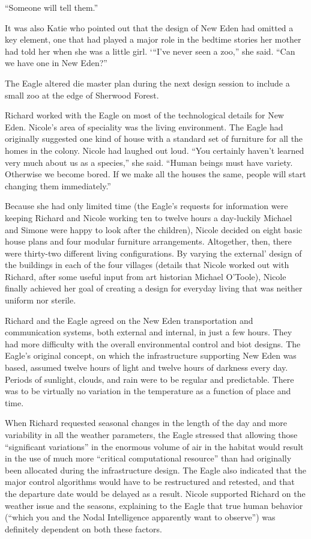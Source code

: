\documentclass[]{article}
\begin{document}
{“Someone will tell them.”

It was also Katie who pointed out that the design of New Eden had omitted a key element, one that had played a major role in the bedtime stories her mother had told her when she was a little girl.  ‘“I’ve never seen a zoo,” she said.  “Can we have one in New Eden?”

The Eagle altered die master plan during the next design session to include a small zoo at the edge of Sherwood Forest.

Richard worked with the Eagle on most of the technological details for New Eden.  Nicole’s area of speciality was the living environment.  The Eagle had originally suggested one kind of house with a standard set of furniture for all the homes in the colony.  Nicole had laughed out loud.  “You certainly haven’t learned very much about us as a species,” she said.  “Human beings must have variety.  Otherwise we become bored.  If we make all the houses the same, people will start changing them immediately.”

Because she had only limited time (the Eagle’s requests for information were keeping Richard and Nicole working ten to twelve hours a day-luckily Michael and Simone were happy to look after the children), Nicole decided on eight basic house plans and four modular furniture arrangements.  Altogether, then, there were thirty-two different living configurations.  By varying the external’ design of the buildings in each of the four villages (details that Nicole worked out with Richard, after some useful input from art historian Michael O’Toole), Nicole finally achieved her goal of creating a design for everyday living that was neither uniform nor sterile.

Richard and the Eagle agreed on the New Eden transportation and communication systems, both external and internal, in just a few hours.  They had more difficulty with the overall environmental control and biot designs.  The Eagle’s original concept, on which the infrastructure supporting New Eden was based, assumed twelve hours of light and twelve hours of darkness every day.  Periods of sunlight, clouds, and rain were to be regular and predictable.  There was to be virtually no variation in the temperature as a function of place and time.

When Richard requested seasonal changes in the length of the day and more variability in all the weather parameters, the Eagle stressed that allowing those “significant variations” in the enormous volume of air in the habitat would result in the use of much more “critical computational resource” than had originally been allocated during the infrastructure design.  The Eagle also indicated that the major control algorithms would have to be restructured and retested, and that the departure date would be delayed as a result.  Nicole supported Richard on the weather issue and the seasons, explaining to the Eagle that true human behavior (“which you and the Nodal Intelligence apparently want to observe”) was definitely dependent on both these factors.

}
\end{document}
